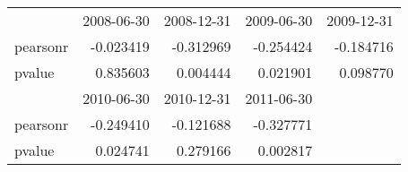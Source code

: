 \begin{tabular}{lrrrr}
\toprule
{} &  2008-06-30 &  2008-12-31 &  2009-06-30 &  2009-12-31  \\
pearsonr &   -0.023419 &   -0.312969 &   -0.254424 &   -0.184716\\
pvalue   &    0.835603 &    0.004444 &    0.021901 &    0.098770\\
\midrule
{} &  2010-06-30 &  2010-12-31 &  2011-06-30 &\\
pearsonr &  -0.249410 &   -0.121688 &   -0.327771& \\
pvalue   &   0.024741 &    0.279166 &    0.002817& \\
\bottomrule
\end{tabular}
